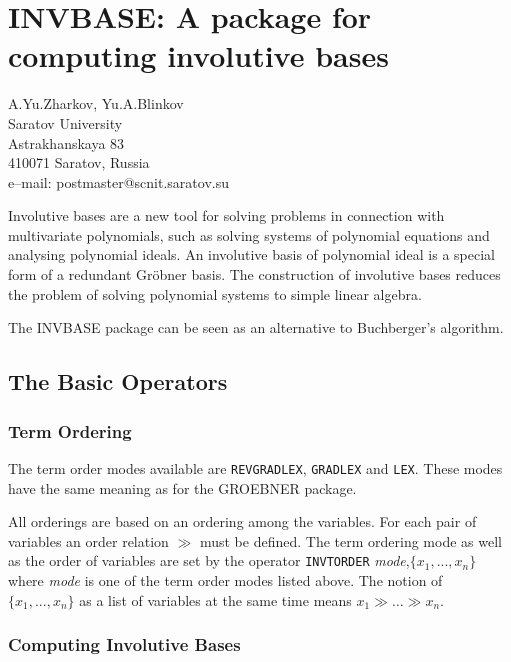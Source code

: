 \chapter[INVBASE: Involutive Bases]%
        {INVBASE: A package for computing involutive bases}
\label{INVBASE}

{\footnotesize
\begin{center}
A.Yu.Zharkov, Yu.A.Blinkov\\
Saratov University\\
Astrakhanskaya 83\\
410071 Saratov, Russia\\[0.05in]
e--mail: postmaster@scnit.saratov.su
\end{center}
}


Involutive bases are a new tool for solving problems in connection
with multivariate polynomials, such as solving systems of polynomial
equations and analysing polynomial ideals.  An involutive basis of
polynomial ideal is a special form of a redundant Gr\"obner basis.
The construction of involutive bases reduces the problem of solving
polynomial systems to simple linear algebra.

The INVBASE package can be seen as an alternative to Buchberger's
algorithm.

\section{The Basic Operators}
\subsection{Term Ordering}
The term order modes available
are
{\tt REVGRADLEX}, {\tt GRADLEX} and {\tt LEX}.
These modes have the same meaning as for the GROEBNER package.

All orderings are based on an ordering among the variables.
For each pair of variables an order relation $\gg$ must be defined.
The term ordering mode as well as the order of variables
are set by the operator
{\tt INVTORDER} {\it mode},$\{x_1,...,x_n\}$
where {\it mode} is one of the term order modes listed above.
The notion of $\{x_1,...,x_n\}$ as a list of variables
at the same time means $x_1\gg \ldots \gg x_n$.

\subsection{Computing Involutive Bases}

